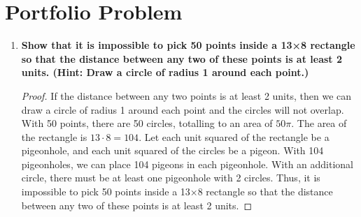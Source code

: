 \documentclass[article, 12pt]{article}
\theoremstyle{definition}
\begin{document}
\section*{Portfolio Problem}
\begin{enumerate}[(1)]
    \item \textbf{Show that it is impossible to pick 50 points inside a 13×8 rectangle so that the distance between any two of these points is at least 2 units. (Hint: Draw a circle of radius 1 around each point.)}
    \begin{proof}
        If the distance between any two points is at least 2 units, then we can draw a circle of radius 1 around each point and the circles will not overlap. With 50 points, there are 50 circles, totalling to an area of $50\pi$. The area of the rectangle is $13 \cdot 8 = 104$. Let each unit squared of the rectangle be a pigeonhole, and each unit squared of the circles be a pigeon. With 104 pigeonholes, we can place 104 pigeons in each pigeonhole. With an additional circle, there must be at least one pigeonhole with 2 circles. Thus, it is impossible to pick 50 points inside a 13×8 rectangle so that the distance between any two of these points is at least 2 units.
    \end{proof}
\end{enumerate}
\end{document}
